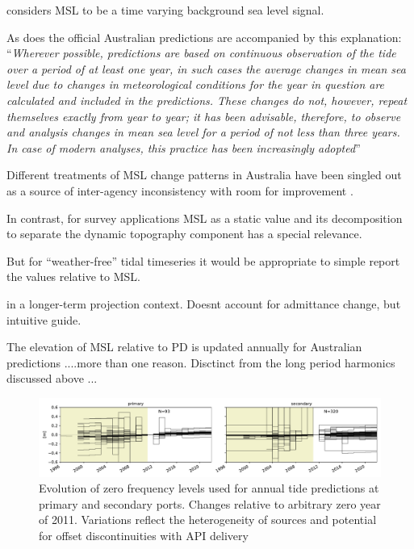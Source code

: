 \cite{Haigh:2013bn} considers MSL to be a time varying background sea level signal.

As does the official Australian predictions are accompanied by this explanation:
``\textit{Wherever possible, predictions are based on continuous observation of the tide over a period of at least one year, in such cases the average changes in mean sea level due to changes in meteorological conditions for the year in question are calculated and included in the predictions.  These changes do not, however, repeat themselves exactly from year to year; it has been advisable, therefore, to observe and analysis changes in mean sea level for a period of not less than three years.   In case of modern analyses, this practice has been increasingly adopted}'' \cite{austides}

Different treatments of MSL change patterns in Australia have been singled out as a source of inter-agency inconsistency with room for improvement \cite{MHL2156}.


In contrast, for survey applications MSL as a static value and its decomposition to separate the dynamic topography component has a special relevance. \cite{Filmer:2018cu}


But for ``weather-free'' tidal timeseries it would be appropriate to simple report the values relative to MSL.

\cite{10.1007/s11069-021-04600-4} in a longer-term projection context.   Doesnt account for admittance change, but intuitive guide.



The elevation of MSL relative to PD is updated annually for Australian predictions ....more than one reason.
Disctinct from the long period harmonics discussed above ...

\begin{figure}[H]\centering
    \includegraphics[width=\figwidthFull]{figures/plots/Z0_evolution.pdf}
        \caption{Evolution of zero frequency levels used for annual tide predictions at primary and secondary ports. Changes relative to arbitrary zero year of 2011. Variations reflect the heterogeneity of sources and potential for offset discontinuities with API delivery}
    \label{fig:z0Evolution}
\end{figure}   



